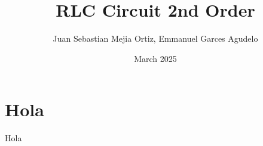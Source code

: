 \documentclass{article}
\title{RLC Circuit 2nd Order}
\author{Juan Sebastian Mejia Ortiz, Emmanuel Garces Agudelo}
\date{March 2025}
\begin{document}
\maketitle

\section{Hola}
Hola
\end{document}
